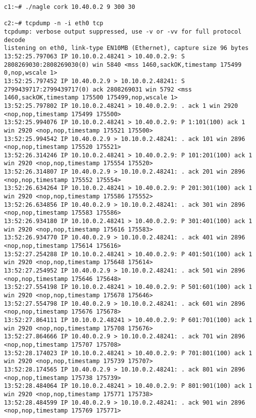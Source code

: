 \documentclass[a4paper,12pt]{article}
\begin{document}
\begin{lstlisting}
c1:~# ./nagle cork 10.40.0.2 9 300 30

c2:~# tcpdump -n -i eth0 tcp
tcpdump: verbose output suppressed, use -v or -vv for full protocol decode
listening on eth0, link-type EN10MB (Ethernet), capture size 96 bytes
13:52:25.797063 IP 10.10.0.2.48241 > 10.40.0.2.9: S 2808269030:2808269030(0) win 5840 <mss 1460,sackOK,timestamp 175499 0,nop,wscale 1>
13:52:25.797452 IP 10.40.0.2.9 > 10.10.0.2.48241: S 2799439717:2799439717(0) ack 2808269031 win 5792 <mss 1460,sackOK,timestamp 175500 175499,nop,wscale 1>
13:52:25.797802 IP 10.10.0.2.48241 > 10.40.0.2.9: . ack 1 win 2920 <nop,nop,timestamp 175499 175500>
13:52:25.994076 IP 10.10.0.2.48241 > 10.40.0.2.9: P 1:101(100) ack 1 win 2920 <nop,nop,timestamp 175521 175500>
13:52:25.994542 IP 10.40.0.2.9 > 10.10.0.2.48241: . ack 101 win 2896 <nop,nop,timestamp 175520 175521>
13:52:26.314246 IP 10.10.0.2.48241 > 10.40.0.2.9: P 101:201(100) ack 1 win 2920 <nop,nop,timestamp 175554 175520>
13:52:26.314807 IP 10.40.0.2.9 > 10.10.0.2.48241: . ack 201 win 2896 <nop,nop,timestamp 175552 175554>
13:52:26.634264 IP 10.10.0.2.48241 > 10.40.0.2.9: P 201:301(100) ack 1 win 2920 <nop,nop,timestamp 175586 175552>
13:52:26.634856 IP 10.40.0.2.9 > 10.10.0.2.48241: . ack 301 win 2896 <nop,nop,timestamp 175583 175586>
13:52:26.934180 IP 10.10.0.2.48241 > 10.40.0.2.9: P 301:401(100) ack 1 win 2920 <nop,nop,timestamp 175616 175583>
13:52:26.934770 IP 10.40.0.2.9 > 10.10.0.2.48241: . ack 401 win 2896 <nop,nop,timestamp 175614 175616>
13:52:27.254288 IP 10.10.0.2.48241 > 10.40.0.2.9: P 401:501(100) ack 1 win 2920 <nop,nop,timestamp 175648 175614>
13:52:27.254952 IP 10.40.0.2.9 > 10.10.0.2.48241: . ack 501 win 2896 <nop,nop,timestamp 175646 175648>
13:52:27.554198 IP 10.10.0.2.48241 > 10.40.0.2.9: P 501:601(100) ack 1 win 2920 <nop,nop,timestamp 175678 175646>
13:52:27.554798 IP 10.40.0.2.9 > 10.10.0.2.48241: . ack 601 win 2896 <nop,nop,timestamp 175676 175678>
13:52:27.864111 IP 10.10.0.2.48241 > 10.40.0.2.9: P 601:701(100) ack 1 win 2920 <nop,nop,timestamp 175708 175676>
13:52:27.864666 IP 10.40.0.2.9 > 10.10.0.2.48241: . ack 701 win 2896 <nop,nop,timestamp 175707 175708>
13:52:28.174023 IP 10.10.0.2.48241 > 10.40.0.2.9: P 701:801(100) ack 1 win 2920 <nop,nop,timestamp 175739 175707>
13:52:28.174565 IP 10.40.0.2.9 > 10.10.0.2.48241: . ack 801 win 2896 <nop,nop,timestamp 175738 175739>
13:52:28.484064 IP 10.10.0.2.48241 > 10.40.0.2.9: P 801:901(100) ack 1 win 2920 <nop,nop,timestamp 175771 175738>
13:52:28.484599 IP 10.40.0.2.9 > 10.10.0.2.48241: . ack 901 win 2896 <nop,nop,timestamp 175769 175771>

\end{lstlisting}
\end{document}
